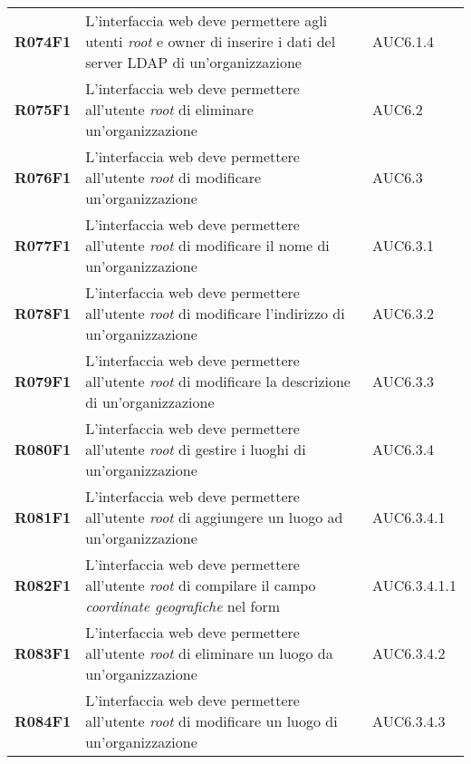 \documentclass[../analisi-dei-requisiti.tex]{subfiles}
\begin{document}
\begin{longtable}[H]{>{\centering\bfseries}m{3cm} >{\centering}m{10cm} >{\centering\arraybackslash}m{3cm}}
  R074F1                  & L'interfaccia web deve permettere agli utenti \textit{root} e owner di inserire i dati del server LDAP di un'organizzazione                    & AUC6.1.4                      \\
  R075F1                  & L'interfaccia web deve permettere all'utente \textit{root} di eliminare un'organizzazione                                                      & AUC6.2                        \\
  R076F1                  & L'interfaccia web deve permettere all'utente \textit{root} di modificare un'organizzazione                                                     & AUC6.3                        \\
  R077F1                  & L'interfaccia web deve permettere all'utente \textit{root} di modificare il nome di un'organizzazione                                          & AUC6.3.1                      \\
  R078F1                  & L'interfaccia web deve permettere all'utente \textit{root} di modificare l'indirizzo di un'organizzazione                                      & AUC6.3.2                      \\
  R079F1                  & L'interfaccia web deve permettere all'utente \textit{root} di modificare la descrizione di un'organizzazione                                   & AUC6.3.3                      \\
  R080F1                  & L'interfaccia web deve permettere all'utente \textit{root} di gestire i luoghi di un'organizzazione                                            & AUC6.3.4                      \\
  R081F1                  & L'interfaccia web deve permettere all'utente \textit{root} di aggiungere un luogo ad un'organizzazione                                         & AUC6.3.4.1                    \\
  R082F1                  & L'interfaccia web deve permettere all'utente \textit{root} di compilare il campo \textit{coordinate geografiche} nel form                      & AUC6.3.4.1.1                  \\
  R083F1                  & L'interfaccia web deve permettere all'utente \textit{root} di eliminare un luogo da un'organizzazione                                          & AUC6.3.4.2                    \\
  R084F1                  & L'interfaccia web deve permettere all'utente \textit{root} di modificare un luogo di un'organizzazione                                         & AUC6.3.4.3                    \\

\end{longtable}
\end{document}
